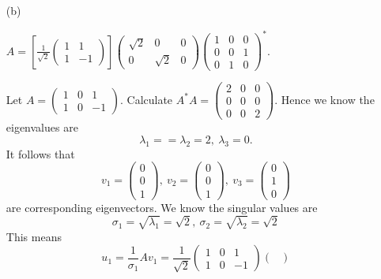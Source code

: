 \begin{Exercise}
\begin{enumerate}[(a)]
		\item[(b)]
		\begin{answer}
			$ A = \left[ \frac{1}{\sqrt{2}}\begin{pmatrix}
			1 & 1 \\
			1 & -1
			\end{pmatrix}\right] \begin{pmatrix}
			\sqrt{2} & 0 & 0 \\
			0 & \sqrt{2} & 0
			\end{pmatrix} \begin{pmatrix}
			1 & 0 & 0 \\
			0 & 0 & 1 \\
			0 & 1 & 0
			\end{pmatrix}^*$.
		\end{answer}
		\begin{solution}
			Let $A = \begin{pmatrix}
			1 & 0 & 1 \\
			1 & 0 & -1
			\end{pmatrix}$.
			Calculate $A^* A = \begin{pmatrix}
			2 & 0 & 0 \\
			0 & 0 & 0 \\
			0 & 0 & 2
			\end{pmatrix}$.
			Hence we know the eigenvalues are
			$$
			\lambda_1 = = \lambda_2 = 2,~ \lambda_3 = 0.
			$$
			It follows that
			$$
			v_1 = \begin{pmatrix}
			0 \\
			0 \\
			1
			\end{pmatrix},~ v_2 = \begin{pmatrix}
			0 \\
			0 \\
			1
			\end{pmatrix},~ v_3 = \begin{pmatrix}
			0 \\
			1 \\
			0
			\end{pmatrix}
			$$
			are corresponding eigenvectors.
			We know the singular values are
			$$
			\sigma_1 = \sqrt{\lambda_1} = \sqrt{2},~
			\sigma_2 = \sqrt{\lambda_2} = \sqrt{2}
			$$
			This means
			$$
			u_1 = \frac{1}{\sigma_1}A v_1 = \frac{1}{\sqrt{2}} \begin{pmatrix}
			1 & 0 & 1 \\
			1 & 0 & -1
			\end{pmatrix} \begin{pmatrix}

\end{pmatrix}$$
\end{solution}
\end{enumerate}
\end{Exercise}
